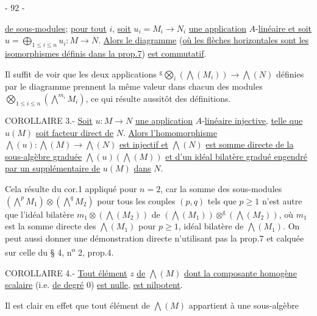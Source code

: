 \begin{center}- 92 -\end{center}

\uline{de sous-modules}; \uline{pour tout} $i$, \uline{soit} $u_i=M_i\to N_i$ \uline{une application} $A$-\uline{linéaire et soit} $u=\bigoplus_{1\leq i\leq n}u_i:M\to N$. \uline{Alors le diagramme}
(\uline{où les flèches horizontales sont les isomorphismes définis dans la prop.7}) \uline{est commutatif}.

Il suffit de voir que les deux applications ${}^{\mathrm g}\!\bigotimes_i(\bigwedge(M_i))\to\bigwedge(N)$ définies par le diagramme prennent la même valeur dans chacun des modules $\bigotimes_{1\leq i\leq n}(\mathop{\bigwedge}\limits^{m_i}M_i)$, ce qui résulte aussitôt des définitions.

COROLLAIRE 3.- \uline{Soit} $u:M\to N$ \uline{une application} $A$-\uline{linéaire injective}, \uline{telle que} $u(M)$ \uline{soit facteur direct de} $N$. \uline{Alors l'homomorphisme} $\bigwedge(u):\bigwedge(M)\to\bigwedge(N)$ \uline{est injectif et} $\bigwedge(N)$ \uline{est somme directe de la sous-algèbre graduée} $\bigwedge(u)(\bigwedge(M))$ \uline{et d'un idéal bilatère gradué engendré par un supplémentaire de} $u(M)$ \uline{dans} $N$.

Cela résulte du cor.1 appliqué pour $n=2$, car la somme des sous-modules $(\mathop{\bigwedge}\limits^p M_1)\otimes(\mathop{\bigwedge}\limits^q M_2)$ pour tous les couples $(p,q)$ tels que $p\geq1$ n'est autre que l'idéal bilatère $m_1\otimes(\bigwedge(M_2))$ de $(\bigwedge(M_1))\otimes^{\mathrm g}(\bigwedge(M_2))$, où $m_1$ est la somme directe des $\bigwedge(M_1)$ pour $p\geq1$, idéal bilatère de $\bigwedge(M_1)$. On peut aussi donner une démonstration directe n'utilisant pas la prop.7 et calquée sur celle du § 4, n\textsuperscript{o} 2, prop.4.

COROLLAIRE 4.- \uline{Tout élément} $z$ \uline{de} $\bigwedge(M)$ \uline{dont la composante homogène scalaire} (i.e. \uline{de degré} 0) \uline{est nulle}, \uline{est nilpotent}.

Il est clair en effet que tout élément de $\bigwedge(M)$ appartient à une sous-algèbre

